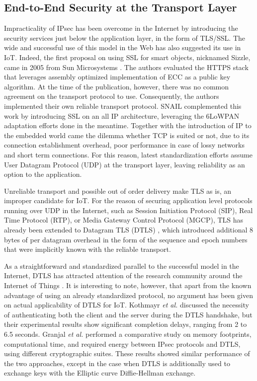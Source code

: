 \documentclass[conference]{IEEEtran}
\begin{document}
\subsection{End-to-End Security at the Transport Layer}
\label{transport-layer-sec}



Impracticality of IPsec has been overcome in the Internet by introducing the
security services just below the application layer, in the form of TLS/SSL. The
wide and successful use of this model in the Web has also suggested its use in
IoT. Indeed, the first proposal on using SSL for smart objects, nicknamed
Sizzle, came in 2005 from Sun Microsystems \cite{sizzle}. The authors evaluated
the HTTPS stack that leverages assembly optimized implementation of  ECC as a public key algorithm. At the time of the
publication, however, there was no common agreement on the transport protocol to
use. Consequently, the authors implemented their own reliable transport
protocol. SNAIL \cite{snail} complemented this work by introducing SSL on an all
IP architecture, leveraging the 6LoWPAN adaptation efforts done in the
meantime. Together with the introduction of IP to the embedded world came the
dilemma whether TCP is suited or not, due to its connection establishment overhead, poor performance in case of lossy networks and short term connections. For this reason, latest standardization efforts \cite{coap-draft} assume User Datagram Protocol (UDP) at the transport layer, leaving reliability as an option to the application.

Unreliable transport and possible out of order delivery make TLS as is, an
improper candidate for IoT. For the reason of securing application level
protocols running over UDP in the Internet, such as Session Initiation Protocol
(SIP), Real Time Protocol (RTP), or Media Gateway Control Protocol (MGCP), TLS
has already been extended to Datagram TLS (DTLS) \cite{dtls-rfc, dtls}, which
introduced additional 8 bytes of per datagram overhead in the form of the
sequence and epoch numbers that were implicitly known with the reliable
transport. 



As a straightforward and standardized parallel to the successful model in the
Internet, DTLS has attracted attention of the research community around the Internet of Things  \cite{raza20126lowpan, brachmann-e2e, kothmayr2012dtls, granjal2012effectiveness, lithe, hummen-certificate}.  It is interesting to note, however, that apart from the known advantage of using an already standardized protocol, no argument has been given on actual applicability of DTLS for IoT.
Kothmayr \emph{et al.} \cite{kothmayr2012dtls} discussed the necessity of authenticating both the client and the server during the DTLS handshake, but their experimental results show significant completion delays, ranging from 2 to 6.5 seconds. Granjal \emph{et al.} \cite{granjal2012effectiveness} performed a comparative study on memory footprints, computational time, and required energy between IPsec protocols and DTLS, using different cryptographic suites. These results showed similar performance of the two approaches, except in the case when DTLS is additionally used to exchange keys with 
the Elliptic curve Diffie-Hellman exchange. 
\end{document}
